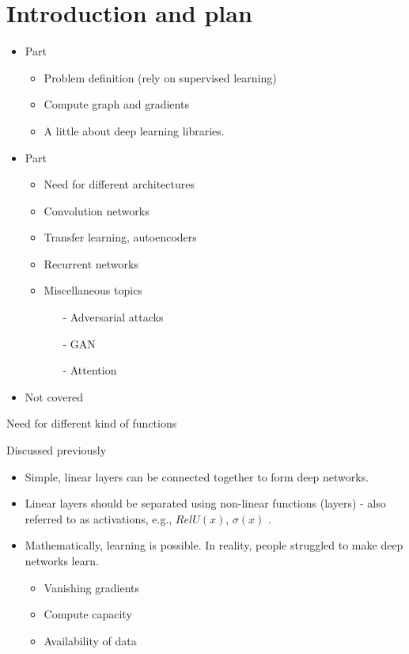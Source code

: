 \section{Introduction and plan}
\begin{frame}{}
	\begin{itemize}
		\item Part 	
			\begin{itemize}
				\item Problem definition (rely on supervised learning)
				\item Compute graph and gradients 
				\item A little about deep learning libraries. 
			\end{itemize}
		\item Part 
			\begin{itemize}
				\item Need for different architectures
				\item Convolution networks
				\item Transfer learning, autoencoders
				\item Recurrent networks  
				\item Miscellaneous topics
					\begin{itemize}
						\item[-] Adversarial attacks 
						\item[-] GAN 
						\item[-] Attention 
					\end{itemize}
			\end{itemize}
		\item Not covered 
	\end{itemize}
\end{frame}
\begin{frame}{Need for different kind of functions}
	\begin{block}{Discussed previously}
		\begin{itemize}
			\item Simple, linear layers can be connected together to form deep networks.
			\item Linear layers should be separated using non-linear functions (layers) - also referred to as activations, e.g., $RelU(x)$, $\sigma(x)$ .
			\item Mathematically, learning is possible. In reality, people struggled to make 
			deep networks learn.
			\begin{itemize}
				\item Vanishing gradients
				\item Compute capacity 
				\item Availability of data 
			\end{itemize}
		\end{itemize}
	\end{block}
\end{frame}


